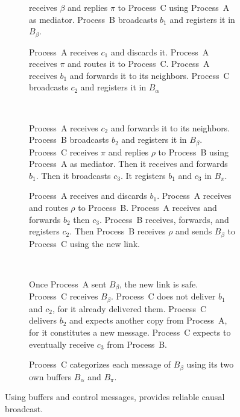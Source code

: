 \begin{figure}
\begin{center}
\begin{subfigure}[t]{0.48\textwidth}
{        receives $\beta$ and replies $\pi$ to Process~C using Process~A as
        mediator. Process~B broadcasts $b_1$ and registers it in $B_\beta$.}
    \end{subfigure}    
    \begin{subfigure}[t]{0.48\textwidth}
      \centering%
      \caption{\label{fig:solveF}Process~A receives $c_1$ and discards it.
        Process~A receives $\pi$ and routes it to Process~C. Process~A receives
        $b_1$ and forwards it to its neighbors. Process~C broadcasts $c_2$ and
        registers it in $B_\alpha$}
    \end{subfigure}
    ~
    \begin{subfigure}[t]{0.48\textwidth}
      \centering%
      \caption{\label{fig:solveG}Process~A receives $c_2$ and forwards it to
        its neighbors.  Process~B broadcasts $b_2$ and registers it in
        $B_\beta$. Process~C receives $\pi$ and replies $\rho$ to Process~B
        using Process~A as mediator. Then it receives and forwards $b_1$. Then
        it broadcasts $c_3$. It registers $b_1$ and $c_3$ in $B_\pi$.}
    \end{subfigure}
    \begin{subfigure}[t]{0.48\textwidth}
      \centering%
      \caption{\label{fig:solveH}Process~A receives and discards $b_1$.
        Process~A receives and routes $\rho$ to Process~B.  Process~A receives
        and forwards $b_2$ then $c_3$. Process~B receives, forwards, and
        registers $c_2$. Then Process~B receives $\rho$ and sends $B_\beta$ to
        Process~C using the new link.}
    \end{subfigure}
    ~
    \begin{subfigure}[t]{0.48\textwidth}
      \centering%
      \caption{\label{fig:solveI}Once Process~A sent $B_\beta$, the new link is
        safe.  Process~C receives $B_\beta$. Process~C does not deliver $b_1$
        and $c_2$, for it already delivered them. Process~C delivers $b_2$ and
        expects another copy from Process~A, for it constitutes a new message.
        Process~C expects to eventually receive $c_3$ from Process~B.}
    \end{subfigure}
    \begin{subfigure}[t]{0.99\textwidth}
      \centering%
      \caption{\label{fig:solveJ}Process~C categorizes each message of
        $B_\beta$ using its two own buffers $B_\alpha$ and $B_\pi$.}
    \end{subfigure}
    \caption{\label{fig:solve}Using buffers and control messages, \RPCBROADCAST 
      provides reliable causal broadcast.}
  \end{center}
\end{figure}

